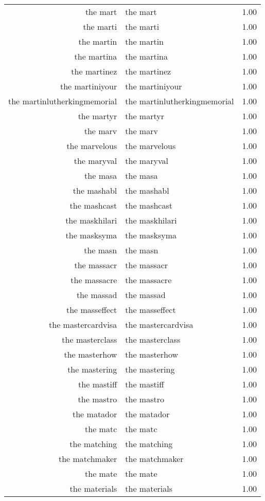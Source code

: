 \begin{table}[ht]
\begin{tabular}{rlr}
  the mart & the mart & 1.00 \\ 
  the marti & the marti & 1.00 \\ 
  the martin & the martin & 1.00 \\ 
  the martina & the martina & 1.00 \\ 
  the martinez & the martinez & 1.00 \\ 
  the martiniyour & the martiniyour & 1.00 \\ 
  the martinlutherkingmemorial & the martinlutherkingmemorial & 1.00 \\ 
  the martyr & the martyr & 1.00 \\ 
  the marv & the marv & 1.00 \\ 
  the marvelous & the marvelous & 1.00 \\ 
  the maryval & the maryval & 1.00 \\ 
  the masa & the masa & 1.00 \\ 
  the mashabl & the mashabl & 1.00 \\ 
  the mashcast & the mashcast & 1.00 \\ 
  the maskhilari & the maskhilari & 1.00 \\ 
  the masksyma & the masksyma & 1.00 \\ 
  the masn & the masn & 1.00 \\ 
  the massacr & the massacr & 1.00 \\ 
  the massacre & the massacre & 1.00 \\ 
  the massad & the massad & 1.00 \\ 
  the masseffect & the masseffect & 1.00 \\ 
  the mastercardvisa & the mastercardvisa & 1.00 \\ 
  the masterclass & the masterclass & 1.00 \\ 
  the masterhow & the masterhow & 1.00 \\ 
  the mastering & the mastering & 1.00 \\ 
  the mastiff & the mastiff & 1.00 \\ 
  the mastro & the mastro & 1.00 \\ 
  the matador & the matador & 1.00 \\ 
  the matc & the matc & 1.00 \\ 
  the matching & the matching & 1.00 \\ 
  the matchmaker & the matchmaker & 1.00 \\ 
  the mate & the mate & 1.00 \\ 
  the materials & the materials & 1.00 \\ 

\end{tabular}
\end{table}
